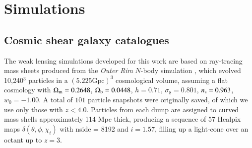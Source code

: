 \section{Simulations}
\label{sec:sims}

\subsection{Cosmic shear galaxy catalogues} 
\label{subsec:WL_cats}

The weak lensing simulations developed for this work are based on ray-tracing mass sheets produced from the {\it Outer Rim} $N$-body simulation \citep{OuterRim}, which evolved 10,240$^3$ particles in a $(5.225 \mathrm{Gpc})^3$ cosmological volume, assuming a flat \lcdm cosmology with $\Omega_{\rm m}=0.2648$, $\Omega_{\rm b}=0.0448$, $h=0.71$, $\sigma_8 = 0.801$, $n_{\rm s}= 0.963$, $w_0=-1.00$.
A total of $101$ particle snapshots were originally saved, of which we use only those with $z<4.0$. Particles from each dump are assigned to curved mass shells approximately 114 Mpc thick, producing a sequence of 57 {\sc Healpix} maps $\delta(\theta, \phi, \chi_i)$ with {\sc nside} = 8192 and $i=1.57$, filling up a light-cone over an octant up to $z = 3$.

